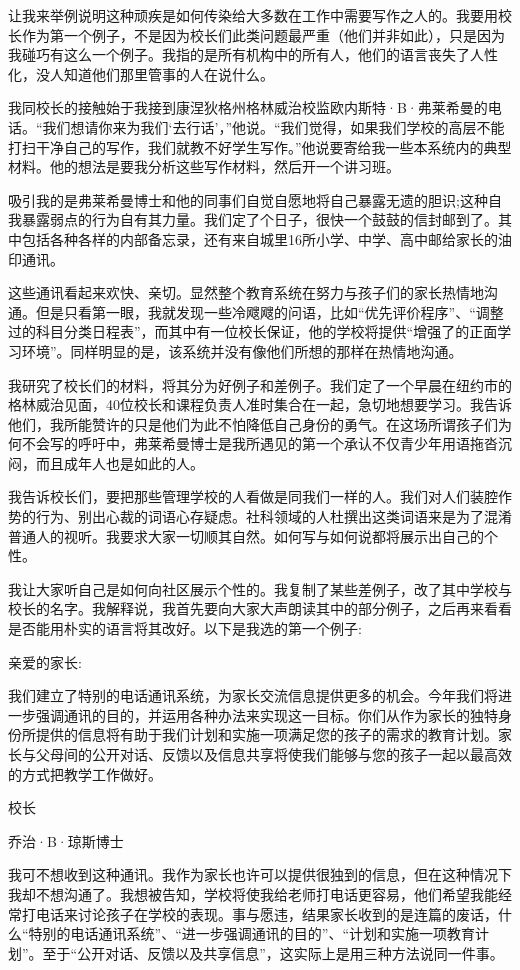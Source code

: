 让我来举例说明这种顽疾是如何传染给大多数在工作中需要写作之人的。我要用校长作为第一个例子，不是因为校长们此类问题最严重（他们并非如此），只是因为我碰巧有这么一个例子。我指的是所有机构中的所有人，他们的语言丧失了人性化，没人知道他们那里管事的人在说什么。

我同校长的接触始于我接到康涅狄格州格林威治校监欧内斯特·B·弗莱希曼的电话。“我们想请你来为我们‘去行话’，”他说。“我们觉得，如果我们学校的高层不能打扫干净自己的写作，我们就教不好学生写作。”他说要寄给我一些本系统内的典型材料。他的想法是要我分析这些写作材料，然后开一个讲习班。

吸引我的是弗莱希曼博士和他的同事们自觉自愿地将自己暴露无遗的胆识;这种自我暴露弱点的行为自有其力量。我们定了个日子，很快一个鼓鼓的信封邮到了。其中包括各种各样的内部备忘录，还有来自城里16所小学、中学、高中邮给家长的油印通讯。

这些通讯看起来欢快、亲切。显然整个教育系统在努力与孩子们的家长热情地沟通。但是只看第一眼，我就发现一些冷飕飕的问语，比如“优先评价程序”、“调整过的科目分类日程表”，而其中有一位校长保证，他的学校将提供“增强了的正面学习环境”。同样明显的是，该系统并没有像他们所想的那样在热情地沟通。

我研究了校长们的材料，将其分为好例子和差例子。我们定了一个早晨在纽约市的格林威治见面，40位校长和课程负责人准时集合在一起，急切地想要学习。我告诉他们，我所能赞许的只是他们为此不怕降低自己身份的勇气。在这场所谓孩子们为何不会写的呼吁中，弗莱希曼博士是我所遇见的第一个承认不仅青少年用语拖沓沉闷，而且成年人也是如此的人。

我告诉校长们，要把那些管理学校的人看做是同我们一样的人。我们对人们装腔作势的行为、别出心裁的词语心存疑虑。社科领域的人杜撰出这类词语来是为了混淆普通人的视听。我要求大家一切顺其自然。如何写与如何说都将展示出自己的个性。

我让大家听自己是如何向社区展示个性的。我复制了某些差例子，改了其中学校与校长的名字。我解释说，我首先要向大家大声朗读其中的部分例子，之后再来看看是否能用朴实的语言将其改好。以下是我选的第一个例子:

亲爱的家长:

我们建立了特别的电话通讯系统，为家长交流信息提供更多的机会。今年我们将进一步强调通讯的目的，并运用各种办法来实现这一目标。你们从作为家长的独特身份所提供的信息将有助于我们计划和实施一项满足您的孩子的需求的教育计划。家长与父母间的公开对话、反馈以及信息共享将使我们能够与您的孩子一起以最高效的方式把教学工作做好。

校长

乔治·B·琼斯博士

我可不想收到这种通讯。我作为家长也许可以提供很独到的信息，但在这种情况下我却不想沟通了。我想被告知，学校将使我给老师打电话更容易，他们希望我能经常打电话来讨论孩子在学校的表现。事与愿违，结果家长收到的是连篇的废话，什么“特别的电话通讯系统”、“进一步强调通讯的目的”、“计划和实施一项教育计划”。至于“公开对话、反馈以及共享信息”，这实际上是用三种方法说同一件事。


